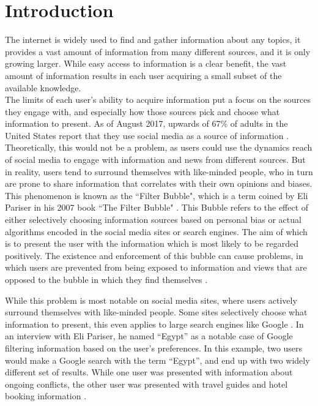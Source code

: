 \chapter{Introduction}
The internet is widely used to find and gather information about any topics, it
provides a vast amount of information from many different sources, and it is
only growing larger.
While easy access to information is a clear benefit, the vast amount of
information results in each user acquiring a small subset of the available
knowledge.\\
The limits of each user's ability to acquire information put a focus on the
sources they engage with, and especially how those sources pick and choose what
information to present.
As of August 2017, upwards of 67\% of adults in the United States report that
they use social media as a source of information \citep{journalism2017}.
Theoretically, this would not be a problem, as users could use the dynamics
reach of social media to engage with information and news from different sources.
But in reality, users tend to surround themselves with like-minded people, who
in turn are prone to share information that correlates with their own opinions
and biases.\\

This phenomenon is known as the ``Filter Bubble", which is a term coined by Eli
Pariser in his 2007 book ``The Filter Bubble" \citep{pariser2011filter}.
This Bubble refers to the effect of either selectively choosing information
sources based on personal bias or actual algorithms encoded in the social media
sites or search engines.
The aim of which is to present the user with the information which is most
likely to be regarded positively.
The existence and enforcement of this bubble can cause problems, in which users
are prevented from being exposed to information and views that are opposed to
the bubble in which they find themselves
\citep[p.59-73]{pariser2011filter}.\nl

While this problem is most notable on social media sites, where users actively
surround themselves with like-minded people. Some sites
selectively choose what information to present, this even applies to large
search engines like Google 
\BadSource.
In an interview with Eli Pariser, he named ``Egypt'' as a notable case of Google
filtering information based on the user's preferences.
In this example, two users would make a Google search with the term ``Egypt'',
and end up with two widely different set of results.
While one user was presented with information about ongoing conflicts, the other
user was presented with travel guides and hotel booking information
\citep{nusSduSearch}.